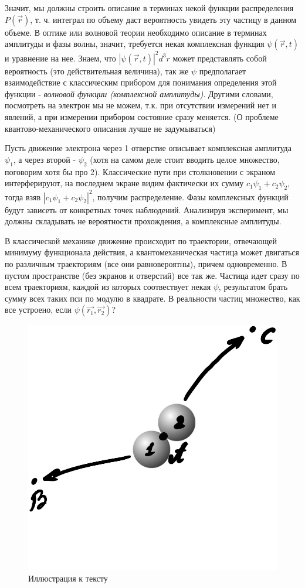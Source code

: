 \par Значит, мы должны строить описание в терминах некой функции распределения $P(\vec{r})$, т. ч. интеграл по объему даст вероятность увидеть эту частицу в данном объеме. В оптике или волновой теории необходимо описание в терминах амплитуды и фазы волны, значит, требуется некая комплексная функция $ \psi (\vec{r}, t)$ и уравнение на нее. Знаем, что $|\psi (\vec{r}, t)|^2 d^3r$ может представлять собой вероятность (это действительная величина), так же $\psi$ предполагает взаимодействие с классическим прибором для понимания определения этой функции - \textit{волновой функции (комплексной амплитуды)}. Другими словами, посмотреть на электрон мы не можем, т.к. при отсутствии измерений нет и явлений, а при измерении прибором состояние сразу меняется. (О проблеме квантово-механического описания лучше не задумываться)
\par Пусть движение электрона через 1 отверстие описывает комплексная амплитуда $\psi _1$, а через второй - $\psi _2$ (хотя на самом деле стоит вводить целое множество, поговорим хотя бы про 2). Классические пути при столкновении с экраном интерферируют, на последнем экране видим фактически их сумму $c_1 \psi _1 + c_2 \psi _2 $, тогда взяв $ |c_1 \psi _1 + c_2 \psi _2 |^2$, получим распределение. Фазы комплексных функций будут зависеть от конкретных точек наблюдений. Анализируя эксперимент, мы должны складывать не вероятности прохождения, а комплексные амплитуды.
\par
\par В классической механике движение происходит по траектории, отвечающей минимуму функционала действия, а квантомеханическая частица может двигаться по различным траекториям (все они равновероятны), причем одновременно. В пустом пространстве (без экранов и отверстий) все так же. Частица идет сразу по всем траекториям, каждой из которых соотвествует некая $\psi$, результатом брать сумму всех таких пси по модулю в квадрате. В реальности частиц множество, как все устроено, если $\psi (\vec{r_1}, \vec{r_2}) $?
\par
\begin{figure} 
\vspace{-2ex}
\centering
\includegraphics[width=0.8\linewidth]{pictures/5.2.jpg}
\caption{Иллюстрация к тексту}
\end{figure}
